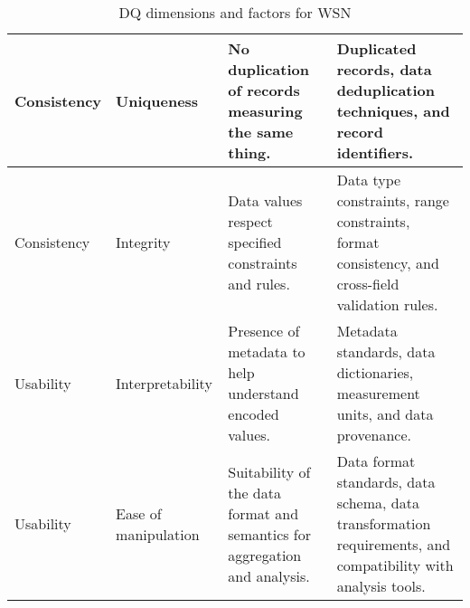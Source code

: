 \begin{table}[H]
\begin{tabular}{|R{2cm}|R{2cm}|R{5cm}|R{5cm}|}
        Consistency                     & Uniqueness             & No duplication of records measuring the same thing.                           & Duplicated records, data deduplication techniques, and record identifiers.                                            \\ \hline
        Consistency                     & Integrity              & Data values respect specified constraints and rules.                          & Data type constraints, range constraints, format consistency, and cross-field validation rules.                       \\ \hline
        Usability                       & Interpretability       & Presence of metadata to help understand encoded values.                       & Metadata standards, data dictionaries, measurement units, and data provenance.                                        \\ \hline
        Usability                       & Ease of manipulation   & Suitability of the data format and semantics for aggregation and analysis.    & Data format standards, data schema, data transformation requirements, and compatibility with analysis tools.          \\ \hline
    \end{tabular}
    \caption{DQ dimensions and factors for WSN}
    \label{table:dq_dimensions}
\end{table}
